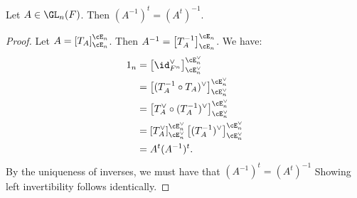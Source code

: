     \begin{lemma}
        Let $A \in \GL_n(F)$. Then $(A^{-1})^t = (A^t)^{-1}$.
    \end{lemma}
        \begin{proof}
            Let $A = \left[T_A\right]_{\cE_n}^{\cE_n}$. Then $A^{-1} = \left[T_A^{-1}\right]_{\cE_n}^{\cE_n}$. We have:
                \begin{equation*}
                \begin{split}
                    1_n 
                    & = \left[\id_{F^n}^\vee\right]_{\cE_n^\vee}^{\cE_n^\vee} \\
                    & = \left[(T_A^{-1} \circ T_A)^\vee\right]_{\cE_n^\vee}^{\cE_n^\vee} \\
                    & = \left[T_A^\vee \circ (T_A^{-1})^\vee\right]_{\cE_n^\vee}^{\cE_n^\vee} \\
                    & = \left[T_A^\vee\right]_{\cE_n^\vee}^{\cE_n^\vee} \left[(T_A^{-1})^\vee\right]_{\cE_n^\vee}^{\cE_n^\vee} \\
                    & = A^t(A^{-1})^t.
                \end{split}
                \end{equation*}
            By the uniqueness of inverses, we must have that $(A^{-1})^t = (A^t)^{-1}$ Showing left invertibility follows identically.
        \end{proof}